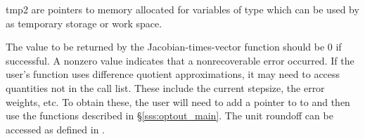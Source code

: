 {{\begin{args}
  \item[tmp2]
    are pointers to memory allocated for variables of type  which
    can be used by  as temporary storage or work space.
  \end{args}
}
{
  The value to be returned by the Jacobian-times-vector function should be 0 if
  successful.  A nonzero value indicates that a nonrecoverable error occurred. 
}
{
  If the user's  function uses difference quotient
  approximations, it may need to access quantities not in the call
  list. These include the current stepsize, the error weights, etc.
  To obtain these, the user will need to add a pointer to  
  to  and then use the  functions described in
  \S\ref{sss:optout_main}. The unit roundoff can be accessed as
   defined in .
}
}
